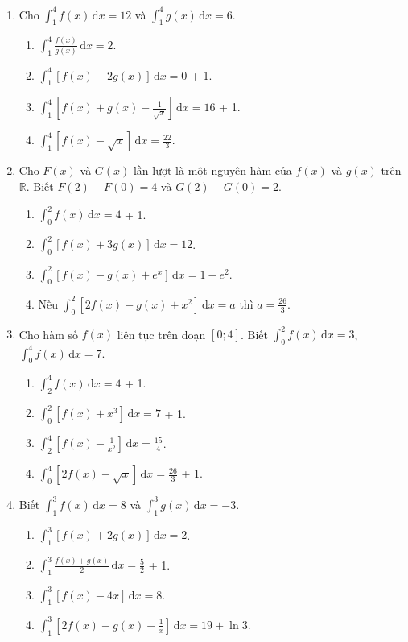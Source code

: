 \documentclass[12pt]{article}
\begin{document}
\begin{enumerate}[label=\textbf{Câu \arabic*.}]
		\item Cho $\displaystyle \int_1^4 f(x)\,\mathrm{d}x = 12$ và $\displaystyle \int_1^4 g(x)\,\mathrm{d}x = 6$.
		\begin{enumerate}[label=\alph*)]			\item $\displaystyle \int_1^4 \frac{f(x)}{g(x)}\,\mathrm{d}x = 2$.
			\item $\displaystyle \int_1^4 [f(x) - 2g(x)]\,\mathrm{d}x = 0$ + 1.
			\item $\displaystyle \int_1^4 \left[f(x) + g(x) - \frac{1}{\sqrt{x}}\right]\,\mathrm{d}x = 16$ + 1.
			\item $\displaystyle \int_1^4 [f(x) - \sqrt{x}]\,\mathrm{d}x = \frac{22}{3}$.
\end{enumerate}
		
		\item Cho $F(x)$ và $G(x)$ lần lượt là một nguyên hàm của $f(x)$ và $g(x)$ trên $\mathbb{R}$. Biết $F(2) - F(0) = 4$ và $G(2) - G(0) = 2$.
		\begin{enumerate}[label=\alph*)]			\item $\displaystyle \int_0^2 f(x)\,\mathrm{d}x = 4$ + 1.
			\item $\displaystyle \int_0^2 [f(x) + 3g(x)]\,\mathrm{d}x = 12$.
			\item $\displaystyle \int_0^2 [f(x) - g(x) + e^x]\,\mathrm{d}x = 1 - e^2$.
			\item Nếu $\displaystyle \int_0^2 [2f(x) - g(x) + x^2]\,\mathrm{d}x = a$ thì $a = \frac{26}{3}$.
\end{enumerate}
		
		\item Cho hàm số $f(x)$ liên tục trên đoạn $[0; 4]$. Biết $\displaystyle \int_0^2 f(x)\,\mathrm{d}x = 3$, $\displaystyle \int_0^4 f(x)\,\mathrm{d}x = 7$.
		\begin{enumerate}[label=\alph*)]			\item $\displaystyle \int_2^4 f(x)\,\mathrm{d}x = 4$ + 1.
			\item $\displaystyle \int_0^2 [f(x) + x^3]\,\mathrm{d}x = 7$ + 1.
			\item $\displaystyle \int_2^4 \left[f(x) - \frac{1}{x^2}\right]\,\mathrm{d}x = \frac{15}{4}$.
			\item $\displaystyle \int_0^4 [2f(x) - \sqrt{x}]\,\mathrm{d}x = \frac{26}{3}$ + 1.
\end{enumerate}
		
		\item Biết $\displaystyle \int_1^3 f(x)\,\mathrm{d}x = 8$ và $\displaystyle \int_1^3 g(x)\,\mathrm{d}x = -3$.
		\begin{enumerate}[label=\alph*)]			\item $\displaystyle \int_1^3 [f(x) + 2g(x)]\,\mathrm{d}x = 2$.
			\item $\displaystyle \int_1^3 \frac{f(x) + g(x)}{2}\,\mathrm{d}x = \frac{5}{2}$ + 1.
			\item $\displaystyle \int_1^3 [f(x) - 4x]\,\mathrm{d}x = 8$.
			\item $\displaystyle \int_1^3 \left[2f(x) - g(x) - \frac{1}{x}\right]\,\mathrm{d}x = 19 + \ln 3$.
\end{enumerate}
		

\end{enumerate}
\end{document}
